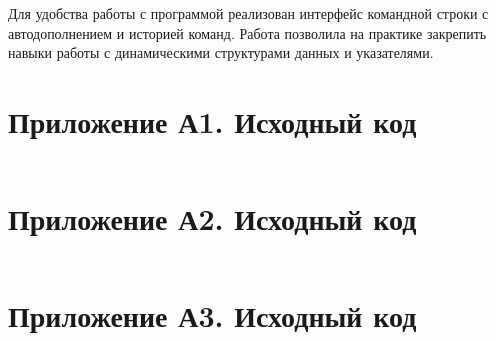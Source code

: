 \documentclass[oneside,a4paper,14pt]{extarticle}
\begin{document}
Для удобства работы с программой реализован интерфейс командной строки с автодополнением и историей команд. Работа позволила на практике закрепить навыки работы с динамическими структурами данных и указателями.

\newpage

\section*{Приложение А1. Исходный код}
\inputminted{c}{code/cdll.h}

\section*{Приложение А2. Исходный код}
\inputminted{c}{code/cdll.c}

\section*{Приложение А3. Исходный код}
\inputminted{c}{code/cli.c}
\end{document}
